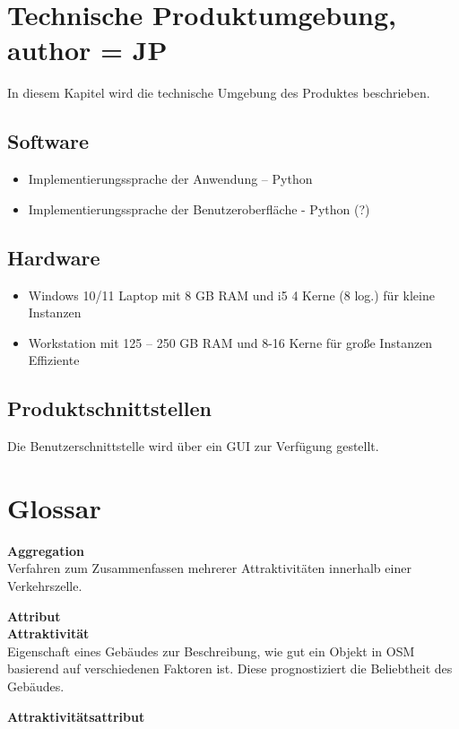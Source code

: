 \documentclass[parskip=full]{scrartcl} %
\begin{document}
\section{Technische Produktumgebung, author = JP}
In diesem Kapitel wird die technische Umgebung des Produktes beschrieben.

\subsection{Software}
\begin{itemize}
    \item Implementierungssprache der Anwendung – Python
    \item Implementierungssprache der Benutzeroberfläche - Python (?)
\end{itemize}

\subsection{Hardware}
\begin{itemize}
    \item Windows 10/11 Laptop mit 8 GB RAM und i5 4 Kerne (8 log.) für kleine Instanzen
    \item Workstation mit 125 – 250 GB RAM und 8-16 Kerne für große Instanzen Effiziente
\end{itemize}

\subsection{Produktschnittstellen}
Die Benutzerschnittstelle wird über ein GUI zur Verfügung gestellt.

\newpage
\section{Glossar}

\textbf{Aggregation}\\
Verfahren zum Zusammenfassen mehrerer Attraktivitäten innerhalb einer Verkehrszelle.

\textbf{Attribut}\\

\textbf{Attraktivität}\\
Eigenschaft eines Gebäudes zur Beschreibung, wie gut ein Objekt in OSM basierend auf verschiedenen Faktoren ist. Diese prognostiziert die Beliebtheit des Gebäudes.

\textbf{Attraktivitätsattribut}\\
\end{document}
